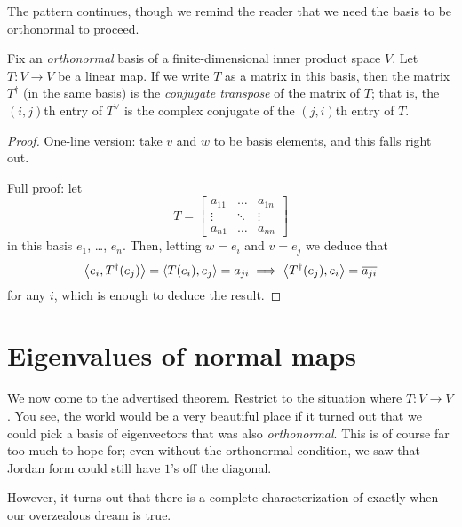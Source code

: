The pattern continues, though we remind the reader that
we need the basis to be orthonormal to proceed.
\begin{theorem}
	Fix an \emph{orthonormal} basis of a finite-dimensional inner product space $V$.
	Let $T \colon V \to V$ be a linear map.
	If we write $T$ as a matrix in this basis,
	then the matrix $T^\dagger$ (in the same basis)
	is the \emph{conjugate transpose} of the matrix of $T$;
	that is, the $(i,j)$th entry of $T^\vee$
	is the complex conjugate of the $(j,i)$th entry of $T$.
\end{theorem}
\begin{proof}
	One-line version: take $v$ and $w$ to be basis elements,
	and this falls right out.

	Full proof: let
	\[ T = \begin{bmatrix}
			a_{11} & \dots & a_{1n} \\
			\vdots & \ddots & \vdots \\
			a_{n1} & \dots & a_{nn}
		\end{bmatrix} \]
	in this basis $e_1$, \dots, $e_n$.
	Then, letting $w = e_i$ and $v = e_j$ we deduce that
	\[ \left< e_i, T^\dagger(e_j) \right> = \left< T(e_i) , e_j\right> = a_{ji}
		\implies
		\left< T^\dagger(e_j), e_i \right> = \overline{a_{ji}} \]
	for any $i$, which is enough to deduce the result.
\end{proof}

\section{Eigenvalues of normal maps}
We now come to the advertised theorem.
Restrict to the situation where $T \colon V \to V$.
You see, the world would be a very beautiful place if it turned out
that we could pick a basis of eigenvectors that was also \emph{orthonormal}.
This is of course far too much to hope for;
even without the orthonormal condition,
we saw that Jordan form could still have $1$'s off the diagonal.

However, it turns out that there is
a complete characterization of exactly when our overzealous dream is true.

